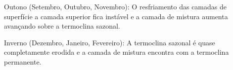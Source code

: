 \documentclass[letterpaper,portuguese,12pt,pdftex]{exam}
\begin{document}
\begin{questions}
\begin{parts}
\begin{solution}
  Outono (Setembro, Outubro, Novembro): O resfriamento das camadas de
  superfície a camada superior fica instável e a camada de mistura aumenta
  avançando sobre a termoclina sazonal.

  Inverno (Dezembro, Janeiro, Fevereiro):  A termoclina sazonal é quase
  completamente erodida e a camada de mistura encontra com a termoclina
  permanente.
  \end{solution}

 \end{parts}

\end{questions}
\end{document}
